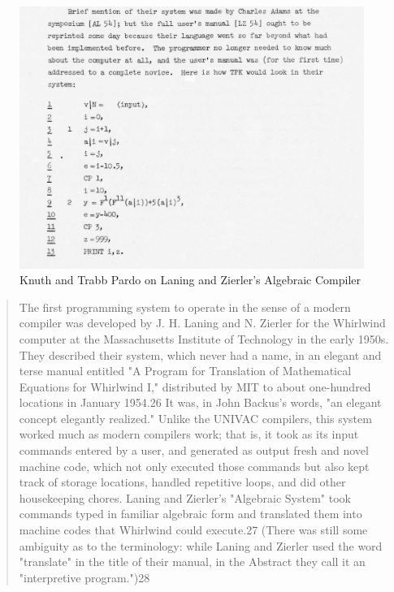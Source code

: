 \begin{figure}[h!]
  \centering
  \includegraphics[width=0.5\linewidth]{resource/knuth_pardo_on_laning_zierlers_algebraic_compiler.png}
  \caption{Knuth and Trabb Pardo on Laning and Zierler's Algebraic Compiler}
  \label{fig:knuth-pardo-on-laning-zierler}
\end{figure}

\begin{quotation}
  The first programming system to operate in the sense of a modern compiler was
  developed by J. H. Laning and N. Zierler for the Whirlwind computer at the
  Massachusetts Institute of Technology in the early 1950s. They described their
  system, which never had a name, in an elegant and terse manual entitled "A
  Program for Translation of Mathematical Equations for Whirlwind I,"
  distributed
  by MIT to about one-hundred locations in January 1954.26 It was, in John
  Backus's words, "an elegant concept elegantly realized." Unlike the UNIVAC
  compilers, this system worked much as modern compilers work; that is, it took
  as its input commands entered by a user, and generated as output fresh and
  novel machine code, which not only executed those commands but also kept track
  of storage locations, handled repetitive loops, and did other housekeeping
  chores. Laning and Zierler's "Algebraic System" took commands typed
  in familiar
  algebraic form and translated them into machine codes that Whirlwind could
  execute.27 (There was still some ambiguity as to the terminology: while Laning
    and Zierler used the word "translate" in the title of their manual, in the
  Abstract they call it an "interpretive program.")28
  \cite{new-history-of-modern-computing}
\end{quotation}

